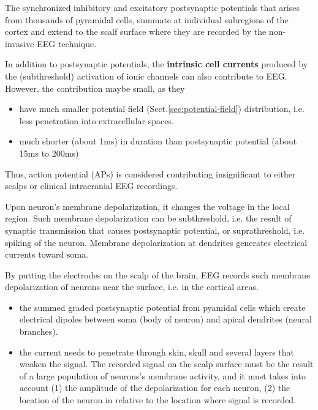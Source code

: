 The synchronized inhibitory and excitatory postsynaptic potentials that arises
from thousands of pyramidal cells, summate at individual subregions of the
cortex and extend to the scalf surface where they are recorded by the
non-invasive EEG technique.

In addition to postsynaptic potentials, the {\bf intrinsic cell currents}
produced by the (subthreshold) activation of ionic channels can also contribute
to EEG. However, the contribution maybe small, as they 
\begin{itemize}
  \item have much smaller potential field (Sect.\ref{sec:potential-field})
  distribution, i.e. less penetration into extracellular spaces.
  
  \item much shorter (about 1ms) in duration than postsynaptic potential (about
  15ms to 200ms)
\end{itemize}
Thus, action potential (APs) is considered contributing insignificant to either
scalps or clinical intracranial EEG recordings. 

Upon neuron's membrane depolarization, it changes the voltage in the local
region. Such membrane depolarization can be subthreshold, i.e. the result of
synaptic transmission that causes postsynaptic potential, or suprathreshold,
i.e. spiking of the neuron. Membrane depolarization at dendrites generates
electrical currents toward soma.

By putting the electrodes on the scalp of the brain, EEG records such membrane
depolarization of neurons near the surface, i.e. in the cortical areas.

\begin{itemize}

  \item   the summed graded postsynaptic potential from pyamidal cells which
   create  electrical  dipoles  between  soma   (body   of  neuron)  and  
   apical   dendrites (neural branches).

  \item the current needs to penetrate through skin, skull and several layers
  that weaken the signal. The recorded signal on the scalp surface must be the
  result of a large population of neurons's membrane activity, and it must takes
  into account (1) the amplitude of the depolarization for each neuron, (2) the
  location of the neuron in relative to the location where signal is recorded.
  
\end{itemize}

